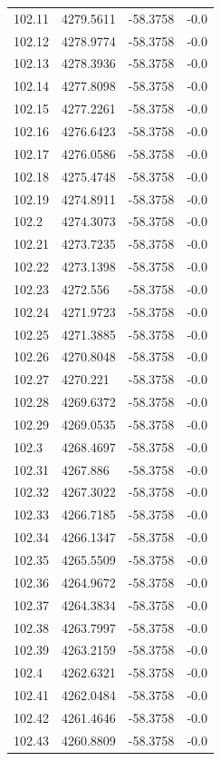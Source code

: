 \begin{table}[H]
\begin{tabular}{llll}
102.11 & 4279.5611 & -58.3758 & -0.0 \\
102.12 & 4278.9774 & -58.3758 & -0.0 \\
102.13 & 4278.3936 & -58.3758 & -0.0 \\
102.14 & 4277.8098 & -58.3758 & -0.0 \\
102.15 & 4277.2261 & -58.3758 & -0.0 \\
102.16 & 4276.6423 & -58.3758 & -0.0 \\
102.17 & 4276.0586 & -58.3758 & -0.0 \\
102.18 & 4275.4748 & -58.3758 & -0.0 \\
102.19 & 4274.8911 & -58.3758 & -0.0 \\
102.2 & 4274.3073 & -58.3758 & -0.0 \\
102.21 & 4273.7235 & -58.3758 & -0.0 \\
102.22 & 4273.1398 & -58.3758 & -0.0 \\
102.23 & 4272.556 & -58.3758 & -0.0 \\
102.24 & 4271.9723 & -58.3758 & -0.0 \\
102.25 & 4271.3885 & -58.3758 & -0.0 \\
102.26 & 4270.8048 & -58.3758 & -0.0 \\
102.27 & 4270.221 & -58.3758 & -0.0 \\
102.28 & 4269.6372 & -58.3758 & -0.0 \\
102.29 & 4269.0535 & -58.3758 & -0.0 \\
102.3 & 4268.4697 & -58.3758 & -0.0 \\
102.31 & 4267.886 & -58.3758 & -0.0 \\
102.32 & 4267.3022 & -58.3758 & -0.0 \\
102.33 & 4266.7185 & -58.3758 & -0.0 \\
102.34 & 4266.1347 & -58.3758 & -0.0 \\
102.35 & 4265.5509 & -58.3758 & -0.0 \\
102.36 & 4264.9672 & -58.3758 & -0.0 \\
102.37 & 4264.3834 & -58.3758 & -0.0 \\
102.38 & 4263.7997 & -58.3758 & -0.0 \\
102.39 & 4263.2159 & -58.3758 & -0.0 \\
102.4 & 4262.6321 & -58.3758 & -0.0 \\
102.41 & 4262.0484 & -58.3758 & -0.0 \\
102.42 & 4261.4646 & -58.3758 & -0.0 \\
102.43 & 4260.8809 & -58.3758 & -0.0 \\

\end{tabular}
\end{table}

